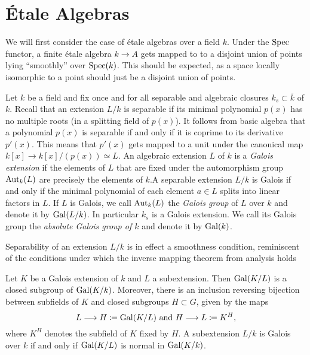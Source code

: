 \section{\'Etale Algebras}
We will first consider the case of \'etale algebras over a field $k$. Under the $\operatorname{Spec}$ functor, a finite \'etale algebra $k \to A$ gets mapped to to a disjoint union of points lying ``smoothly'' over $\operatorname{Spec}(k)$. This should be expected, as a space locally isomorphic to a point should just be a disjoint union of points.

\begin{construction}
	Let $k$ be a field and fix once and for all separable and algebraic closures $k_s \subset \overline{k}$ of $k$. Recall that an extension $L/k$ is separable if its minimal polynomial $p(x)$ has no multiple roots (in a splitting field of $p(x)$). It follows from basic algebra that a polynomial $p(x)$ is separable if and only if it is coprime to its derivative $p'(x)$. This means that $p'(x)$ gets mapped to a unit under the canonical map $k[x] \to k[x]/(p(x)) \simeq L$. An algebraic extension $L$ of $k$ is a \textit{Galois extension} if the elements of $L$ that are fixed under the automorphism group $\operatorname{Aut}_k(L)$ are precisely the elements of $k$.A separable extension $L/k$ is Galois if and only if the minimal polynomial of each element $a \in L$ splits into linear factors in $L$. If $L$ is Galois, we call $\operatorname{Aut}_k(L)$ the \textit{Galois group} of $L$ over $k$ and denote it by $\operatorname{Gal}(L/k)$. In particular $k_s$ is a Galois extension. We call its Galois group the \textit{absolute Galois group of $k$} and denote it by $\operatorname{Gal}(k)$.
\end{construction}

\begin{remark}
	Separability of an extension $L/k$ is in effect a smoothness condition, reminiscent of the conditions under which the inverse mapping theorem from analysis holds
\end{remark}


\begin{theorem}
	Let $K$ be a Galois extension of $k$ and $L$ a subextension. Then $\operatorname{Gal}(K/L)$ is a closed subgroup of $\operatorname{Gal}(K/k)$. Moreover, there is an inclusion reversing bijection between subfields of $K$ and closed subgroups $H \subset G$, given by the maps
	\[
		L \longrightarrow H \coloneqq \operatorname{Gal}(K/L) \ \text{and} \ H \longrightarrow L \coloneqq K^H,
	\]
	where $K^H$ denotes the subfield of $K$ fixed by $H$. A subextension $L/k$ is Galois over $k$ if and only if $\operatorname{Gal}(K/L)$ is normal in $\operatorname{Gal}(K/k)$.
\end{theorem}

